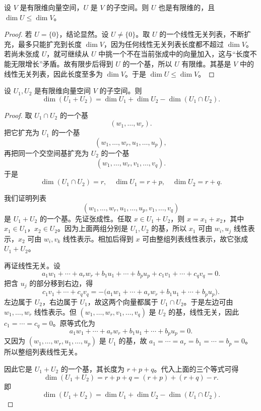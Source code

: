 \begin{proposition} 设 $V$ 是有限维向量空间，$U$ 是 $V$ 的子空间。则 $U$ 也是有限维的，且 $\dim U\le \dim V$。
\end{proposition}

\begin{proof} 若 $U=\{0\}$，结论显然。设 $U\neq\{0\}$。取 $U$ 的一个线性无关列表，不断扩充，最多只能扩充到长度 $\dim V$，因为任何线性无关列表长度都不超过 $\dim V$。若尚未张成 $U$，就可继续从 $U$ 中挑一个不在当前张成中的向量加入，这与“长度不能无限增长”矛盾。故有限步后得到 $U$ 的一个基，所以 $U$ 有限维。其基是 $V$ 中的线性无关列表，因此长度至多为 $\dim V$。于是 $\dim U\le\dim V$。
\end{proof}

\begin{theorem} 设 $U_1,U_2$ 是有限维向量空间 $V$ 的子空间。则
\[ \dim(U_1+U_2)=\dim U_1+\dim U_2-\dim(U_1\cap U_2). \]
\end{theorem}

\begin{proof} 取 $U_1\cap U_2$ 的一个基
\[ (w_1,\dots,w_r). \]
把它扩充为 $U_1$ 的一个基
\[ (w_1,\dots,w_r,u_1,\dots,u_p), \]
再把同一个交空间基扩充为 $U_2$ 的一个基
\[ (w_1,\dots,w_r,v_1,\dots,v_q). \]
于是
\[ \dim(U_1\cap U_2)=r, \quad \dim U_1=r+p, \quad \dim U_2=r+q. \]

我们证明列表
\[ (w_1,\dots,w_r,u_1,\dots,u_p,v_1,\dots,v_q) \]
是 $U_1+U_2$ 的一个基。先证张成性。任取 $x\in U_1+U_2$，则 $x=x_1+x_2$，其中 $x_1\in U_1$，$x_2\in U_2$。因为上面两组分别是 $U_1,U_2$ 的基，所以 $x_1$ 可由 $w_i,u_j$ 线性表示，$x_2$ 可由 $w_i,v_k$ 线性表示。相加后得到 $x$ 可由整组列表线性表示，故它张成 $U_1+U_2$。

再证线性无关。设
\[ a_1w_1+\cdots+a_rw_r+b_1u_1+\cdots+b_pu_p+c_1v_1+\cdots+c_qv_q=0. \]
把含 $u_j$ 的部分移到右边，得
\[ c_1v_1+\cdots+c_qv_q = -\bigl(a_1w_1+\cdots+a_rw_r+b_1u_1+\cdots+b_pu_p\bigr). \]
左边属于 $U_2$，右边属于 $U_1$，故这两个向量都属于 $U_1\cap U_2$。于是左边可由 $w_1,\dots,w_r$ 线性表示。但 $(w_1,\dots,w_r,v_1,\dots,v_q)$ 是 $U_2$ 的基，线性无关，因此 $c_1=\cdots=c_q=0$。原等式化为
\[ a_1w_1+\cdots+a_rw_r+b_1u_1+\cdots+b_pu_p=0. \]
又因为 $(w_1,\dots,w_r,u_1,\dots,u_p)$ 是 $U_1$ 的基，故 $a_1=\cdots=a_r=b_1=\cdots=b_p=0$。所以整组列表线性无关。

因此它是 $U_1+U_2$ 的一个基，其长度为 $r+p+q$。代入上面的三个等式可得
\[ \dim(U_1+U_2)=r+p+q=(r+p)+(r+q)-r. \]
即
\[ \dim(U_1+U_2)=\dim U_1+\dim U_2-\dim(U_1\cap U_2). \]
\end{proof}


